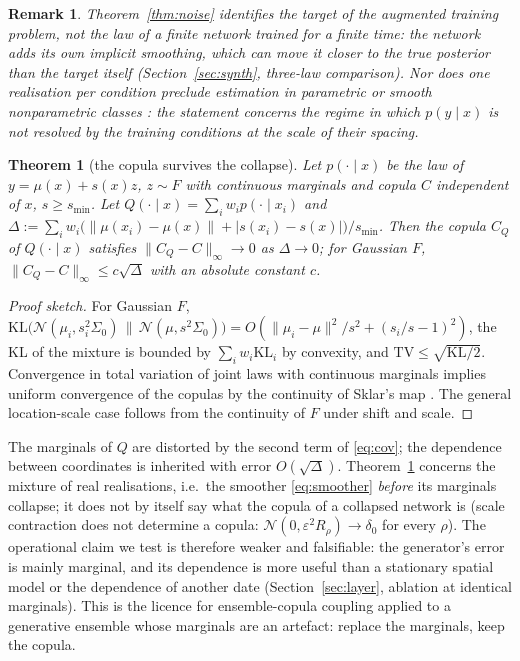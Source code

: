 \documentclass[11pt]{article}
\newtheorem{theorem}{Theorem}
\newtheorem{remark}{Remark}
\begin{document}
\begin{remark}
Theorem~\ref{thm:noise} identifies the \emph{target} of the augmented training problem, not the law of a finite network trained for a finite time: the network adds its own implicit smoothing, which can move it closer to the true posterior than the target itself (Section~\ref{sec:synth}, three-law comparison). Nor does one realisation per condition preclude estimation in parametric or smooth nonparametric classes \citep{tang2024conditional}: the statement concerns the regime in which $p(y\mid x)$ is not resolved by the training conditions at the scale of their spacing.
\end{remark}

\begin{theorem}[the copula survives the collapse]
\label{thm:copula}
Let $p(\cdot\mid x)$ be the law of $y=\mu(x)+s(x)z$, $z\sim F$ with continuous marginals and copula $C$ independent of $x$, $s\ge s_{\min}$. Let $Q(\cdot\mid x)=\sum_iw_ip(\cdot\mid x_i)$ and $\Delta:=\sum_iw_i\big(\|\mu(x_i)-\mu(x)\|+|s(x_i)-s(x)|\big)/s_{\min}$. Then the copula $C_Q$ of $Q(\cdot\mid x)$ satisfies $\|C_Q-C\|_\infty\to0$ as $\Delta\to0$; for Gaussian $F$, $\|C_Q-C\|_\infty\le c\sqrt\Delta$ with an absolute constant $c$.
\end{theorem}
\begin{proof}[Proof sketch]
For Gaussian $F$, $\mathrm{KL}\big(\mathcal N(\mu_i,s_i^2\Sigma_0)\,\|\,\mathcal N(\mu,s^2\Sigma_0)\big)=O(\|\mu_i-\mu\|^2/s^2+(s_i/s-1)^2)$, the KL of the mixture is bounded by $\sum_iw_i\mathrm{KL}_i$ by convexity, and $\mathrm{TV}\le\sqrt{\mathrm{KL}/2}$. Convergence in total variation of joint laws with continuous marginals implies uniform convergence of the copulas by the continuity of Sklar's map \citep{deheuvels1979,sempi2004}. The general location-scale case follows from the continuity of $F$ under shift and scale.
\end{proof}
The marginals of $Q$ are distorted by the second term of \eqref{eq:cov}; the dependence between coordinates is inherited with error $O(\sqrt\Delta)$. Theorem~\ref{thm:copula} concerns the mixture of real realisations, i.e.\ the smoother \eqref{eq:smoother} \emph{before} its marginals collapse; it does not by itself say what the copula of a collapsed network is (scale contraction does not determine a copula: $\mathcal N(0,\varepsilon^2R_\rho)\to\delta_0$ for every $\rho$). The operational claim we test is therefore weaker and falsifiable: the generator's error is mainly marginal, and its dependence is more useful than a stationary spatial model or the dependence of another date (Section~\ref{sec:layer}, ablation at identical marginals). This is the licence for ensemble-copula coupling \citep{schefzik2013ecc} applied to a generative ensemble whose marginals are an artefact: replace the marginals, keep the copula.
\end{document}
